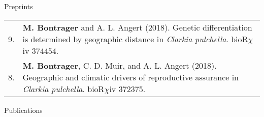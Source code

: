 \documentclass[letterpaper,11pt,oneside]{article}
\newcommand\hangbibentry[1]{%
    \smallskip\par\hangpara{1em}{1}\bibentry{#1}\smallskip\par 
}
\begin{document}

\bgroup
\noindent\Large{Preprints} 
\normalsize
\bigskip

\def\arraystretch{1.2}
\noindent \begin{tabular}{@{} p{1cm} >{\raggedright\arraybackslash}p{15.11cm}}
9. & \textbf{M. Bontrager} and A. L. Angert (2018). Genetic differentiation is determined by geographic distance in \textit{Clarkia pulchella}. bioR$\chi$iv 374454. \\
8. & \textbf{M. Bontrager}, C. D. Muir, and A. L. Angert (2018). Geographic and climatic drivers of reproductive assurance in \textit{Clarkia pulchella}. bioR$\chi$iv 372375. \\
\end{tabular}
\egroup
\bigskip
\bigskip


\bgroup
\noindent\Large{Publications}  
\normalsize
\bigskip
\end{document}

